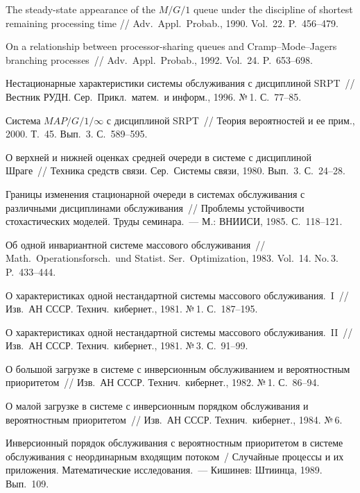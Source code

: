 \begin{multicols}{2}
{{\begin{thebibliography}{99}
 The steady-state appearance of the $M/G/1$
queue under the discipline of shortest remaining processing
time // Adv.\ Appl.\ Probab., 1990. Vol.~22. P.~456--479.

On a relationship between processor-sharing
queues and Cramp--Mode--Jagers branching proc\-esses~//
Adv.\ Appl.\ Probab., 1992. Vol.~24. P.~653--698.

Нестационарные характеристики сис\-те\-мы обслуживания с
дисциплиной SRPT~// Вестник РУДН. Сер.\ Прикл.\ матем.\ и информ.,
1996. №\,1. С.~77--85.

Система $MAP/G/1/\infty$ с дисциплиной SRPT~//
Теория вероятностей и ее прим., 2000. Т.~45. Вып.~3. С.~589--595.

О верхней и нижней оценках средней очереди в системе
с дисциплиной Шраге~// Техника средств связи. Сер.\ Системы связи,
1980. Вып.~3. С.~24--28.

Границы изменения стационарной очереди в системах
обслуживания с различными дисциплинами обслуживания~// Проблемы
устой\-чи\-вости стохастических моделей. Труды семинара.~--- М.: ВНИИСИ, 1985.
С.~118--121.

Об одной инвариантной системе массового обслуживания~//
Math.\ Operationsforsch.\ und Statist. Ser.\ Optimization, 1983. Vol.~14.
No.\,3. P.~433--444.

О характеристиках одной нестандартной системы массового
обслуживания.~I~// Изв.\ АН СССР. Технич.\ кибернет., 1981.
№\,1. С.~187--195.

О характеристиках одной нестандартной системы массового
обслуживания.~II~// Изв.\ АН СССР. Технич.\ кибернет., 1981.
№\,3. С.~91--99.

О большой загрузке в системе с инверсионным
обслуживанием и вероятностным приоритетом~// Изв.\ АН СССР.
Технич.\ кибернет., 1982. №\,1. С.~86--94.

О малой загрузке в системе с инверсионным
порядком обслуживания и вероятностным приоритетом~//
Изв.\ АН СССР. Технич.\ кибернет., 1984. №\,6.

Инверсионный порядок обслуживания с вероятностным
приоритетом в системе обслуживания с неординарным входящим потоком~/
Случайные процессы и их приложения. Математические исследования.~---
Кишинев: Штиинца, 1989. Вып.~109.


\end{thebibliography}}}
\end{multicols}
